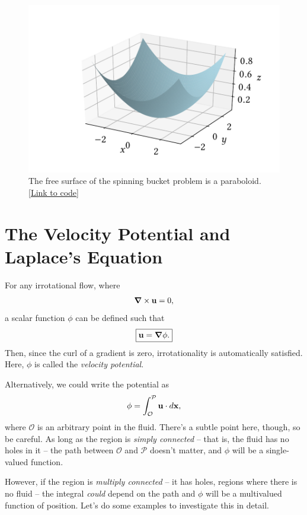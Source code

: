 \begin{figure}
\centering\includegraphics[width=0.8\linewidth]{Figures/Chapter3/fig_paraboloid}
\caption{The free surface of the spinning bucket problem is a paraboloid.  \href{https://nbviewer.jupyter.org/github/josephmacmillan/IntroFluidDynamics/blob/master/Jupyter/3-IdealFluids.ipynb\#Figure-3.3:--Uniformly-rotating-fluid}{[Link to code]}}
\label{fig_bucket_para}
\end{figure}





\section{The Velocity Potential and Laplace's Equation}

For any irrotational flow, where
\[
\boldsymbol{\nabla} \times \mathbf{u} = 0,
\]
a scalar function $\phi$ can be defined such that
\begin{equation}
\label{eq_vel_pot}
\boxed{
\mathbf{u} = \boldsymbol{\nabla} \phi.
}
\end{equation}
Then, since the curl of a gradient is zero, irrotationality is automatically satisfied.  Here, $\phi$ is called the \emph{velocity potential}.

Alternatively, we could write the potential as
\begin{equation}
\label{eq_vel_pot2}
\phi = \int_\mathcal{O}^\mathcal{P} \mathbf{u} \cdot d\mathbf{x},
\end{equation}
where $\mathcal{O}$ is an arbitrary point in the fluid.  There's a subtle point here, though, so be careful.  As long as the region is \emph{simply connected} -- that is, the fluid has no holes in it -- the path between $\mathcal{O}$ and $\mathcal{P}$ doesn't matter, and $\phi$ will be a single-valued function.

However, if the region is \emph{multiply connected} -- it has holes, regions where there is no fluid -- the integral \emph{could} depend on the path and $\phi$ will be a multivalued function of position.  Let's do some examples to investigate this in detail.

